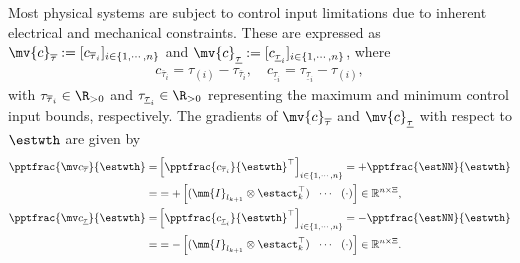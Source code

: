 \documentclass[journal]{IEEEtran}
\begin{document}
Most physical systems are subject to control input limitations due to inherent electrical and mechanical constraints.
These are expressed as $\mv{c}_{\overline \tau}:= [c_{\overline \tau_i}]_{i\in\{1,\cdots,n\}}$ and $\mv{c}_{\underline\tau}:= [c_{\underline\tau_i}]_{i\in\{1,\cdots,n\}}$, where
\begin{equation}
    \begin{aligned}
        c_{\overline \tau_i}=\tau_{(i)} - {\tau_{\overline \tau_i}}
        ,
        \quad
        c_{\underline\tau_i}={\tau_{\underline\tau_i}}-\tau_{(i)}
        ,
    \end{aligned}
    \label{eq:cstr:input:bound}
\end{equation}
with $\tau_{\overline \tau_i}\in\R_{>0}$ and $\tau_{\underline\tau_i}\in\R_{>0}$ representing the maximum and minimum control input bounds, respectively.
The gradients of $\mv{c}_{\overline \tau}$ and $\mv{c}_{\underline\tau}$ with respect to $\estwth$ are given by
\begin{equation}
    \begin{aligned}
        \pptfrac{\mv c_{\overline \tau}}{\estwth}
        =& 
        \left[
            \pptfrac{c_{\overline \tau_i}}{\estwth}^\top
        \right]_{i\in\{1,\cdots,n\}}
        = 
            +\pptfrac{\estNN}{\estwth}
            \\
        =&
        =
        +
        \begin{bmatrix}
            (\mm{I}_{l_{k+1}}\otimes \estact_{k}^\top)&
            \!\cdots\! &
            (
                \cdot
            )
        \end{bmatrix} 
        \in
        \mathbb R^{n\times \Xi}
        , 
        \\
        \pptfrac{\mv c_{\underline\tau}}{\estwth}         
        =
        & 
        \left[
            \pptfrac{c_{\underline\tau_i}}{\estwth}^\top
        \right]_{i\in\{1,\cdots,n\}}
        = 
        -\pptfrac{\estNN}{\estwth}
        \\
        =&
        =
        -\begin{bmatrix}
            (\mm{I}_{l_{k+1}}\otimes \estact_{k}^\top)&
            \!\cdots\! &
            (
                \cdot
            )
        \end{bmatrix} 
        \in
        \mathbb R^{n\times \Xi}
        .
    \end{aligned}
    \label{eq:cstr:input:bound:grad}
\end{equation}
\end{document}

